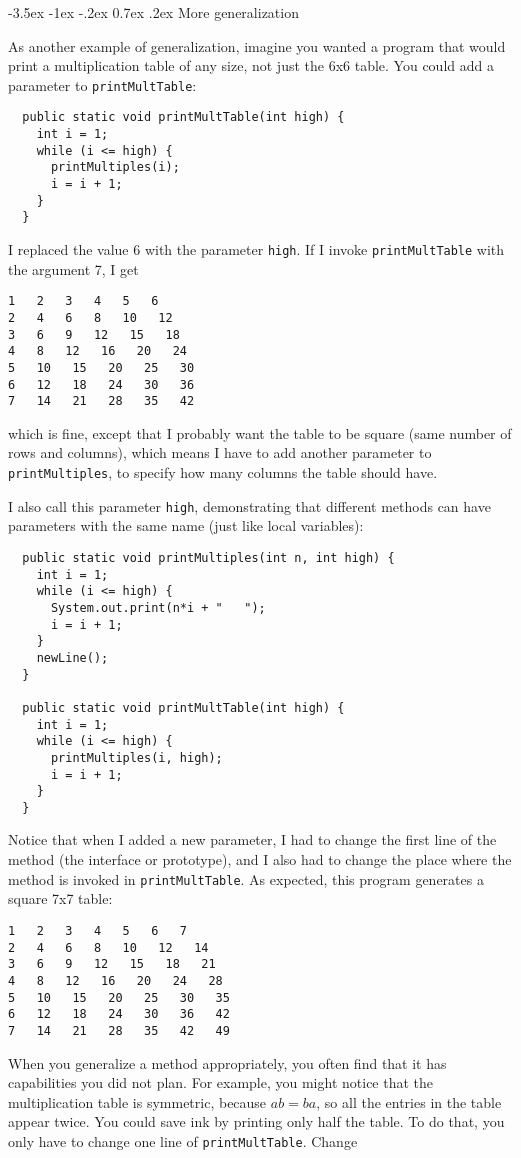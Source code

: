\documentclass{book}
\makeatletter
\renewcommand{\section}{\@startsection 
    {section} {1} {0mm}%
    {-3.5ex \@plus -1ex \@minus -.2ex}%
    {0.7ex \@plus.2ex}%
    {\normalfont\Large\bfseries}}
\makeatother
\begin{document}

\section{More generalization}

As another example of generalization, imagine you wanted
a program that would print a multiplication table of any
size, not just the 6x6 table.  You could add a parameter to
{\tt printMultTable}:

\begin{verbatim}
  public static void printMultTable(int high) {
    int i = 1;
    while (i <= high) {
      printMultiples(i);
      i = i + 1;
    }
  }
\end{verbatim}
%
I replaced the value 6 with the parameter {\tt high}.  If I
invoke {\tt printMultTable} with the argument 7, I get

\begin{verbatim}
1   2   3   4   5   6   
2   4   6   8   10   12   
3   6   9   12   15   18   
4   8   12   16   20   24   
5   10   15   20   25   30   
6   12   18   24   30   36   
7   14   21   28   35   42   
\end{verbatim}
%
which is fine, except that I probably want the table to
be square (same number of rows and columns), which means
I have to add another parameter to {\tt printMultiples},
to specify how many columns the table should have.

I also call this parameter {\tt high},
demonstrating that different methods can have parameters
with the same name (just like local variables):

\begin{verbatim}
  public static void printMultiples(int n, int high) {
    int i = 1;
    while (i <= high) {
      System.out.print(n*i + "   ");
      i = i + 1;
    }    
    newLine();
  }

  public static void printMultTable(int high) {
    int i = 1;
    while (i <= high) {
      printMultiples(i, high);
      i = i + 1;
    }
  }
\end{verbatim}
%
Notice that when I added a new parameter, I had to change the first
line of the method (the interface or prototype), and I also had to
change the place where the method is invoked in {\tt printMultTable}.
As expected, this program generates a square 7x7 table:

\begin{verbatim}
1   2   3   4   5   6   7   
2   4   6   8   10   12   14   
3   6   9   12   15   18   21   
4   8   12   16   20   24   28   
5   10   15   20   25   30   35   
6   12   18   24   30   36   42   
7   14   21   28   35   42   49
\end{verbatim}
%
When you generalize a method appropriately, you often find
that it has capabilities you did not plan.
For example, you might notice that the multiplication table
is symmetric, because $ab = ba$, so all the entries in the
table appear twice.  You could save ink by printing only
half the table.  To do that, you only have to change one
line of {\tt printMultTable}.  Change
\end{document}
